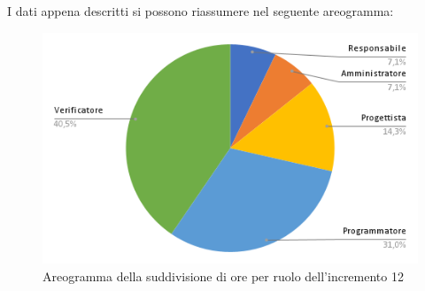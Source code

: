 \pagebreak
I dati appena descritti si possono riassumere nel seguente areogramma:
\begin{figure}[!h]
    \vspace{5px}
    \includegraphics[scale=0.5]{../../../Images/Diagrammi/Diagramma a torta/areogrammaIncremento12.png}
    \centering
    \caption{Areogramma della suddivisione di ore per ruolo dell'incremento 12}
\end{figure}

